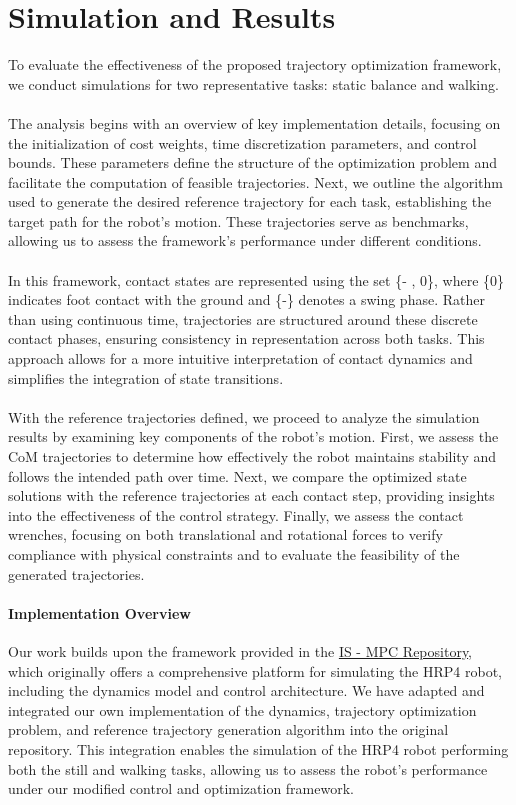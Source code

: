 \documentclass[main.tex]{subfiles}
\begin{document}
 
\begin{sloppypar}
\section{Simulation and Results}
\label{sec:newsimulation}
To evaluate the effectiveness of the proposed trajectory optimization framework, we conduct simulations for two representative tasks: static balance and walking. \\
\\
The analysis begins with an overview of key implementation details, focusing on the initialization of cost weights, time discretization parameters, and control bounds. These parameters define the structure of the optimization problem and facilitate the computation of feasible trajectories. Next, we outline the algorithm used to generate the desired reference trajectory for each task, establishing the target path for the robot’s motion. These trajectories serve as benchmarks, allowing us to assess the framework’s performance under different conditions.\\
\\
In this framework, contact states are represented using the set \{- , 0\}, where \{0\} indicates foot contact with the ground and \{-\} denotes a swing phase. Rather than using continuous time, trajectories are structured around these discrete contact phases, ensuring consistency in representation across both tasks. This approach allows for a more intuitive interpretation of contact dynamics and simplifies the integration of state transitions. \\
\\
With the reference trajectories defined, we proceed to analyze the simulation results by examining key components of the robot’s motion. First, we assess the CoM trajectories to determine how effectively the robot maintains stability and follows the intended path over time. Next, we compare the optimized state solutions with the reference trajectories at each contact step, providing insights into the effectiveness of the control strategy. Finally, we assess the contact wrenches, focusing on both translational and rotational forces to verify compliance with physical constraints and to evaluate the feasibility of the generated trajectories. \\
\paragraph{Implementation Overview}
Our work builds upon the framework provided in the \href{https://github.com/DIAG-Robotics-Lab/ismpc}{IS - MPC Repository}, which originally offers a comprehensive platform for simulating the HRP4 robot, including the dynamics model and control architecture. We have adapted and integrated our own implementation of the dynamics, trajectory optimization problem, and reference trajectory generation algorithm into the original repository. This integration enables the simulation of the HRP4 robot performing both the still and walking tasks, allowing us to assess the robot’s performance under our modified control and optimization framework.

\end{sloppypar}
\end{document}
